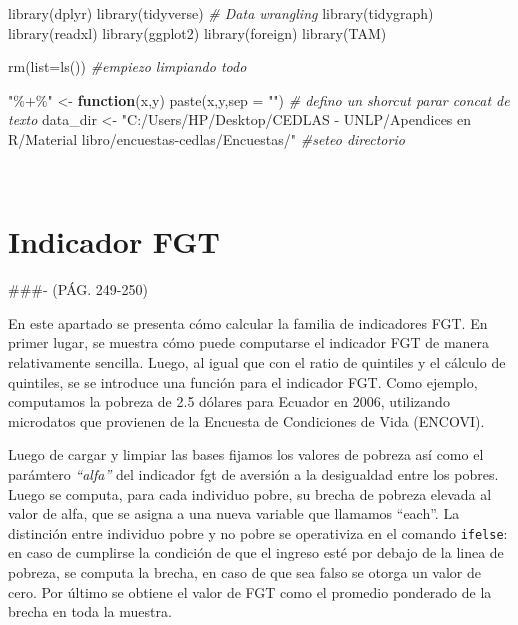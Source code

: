 \documentclass[
]{book}
\newenvironment{Shaded}{\begin{snugshade}}{\end{snugshade}}
\newcommand{\AttributeTok}[1]{\textcolor[rgb]{0.77,0.63,0.00}{#1}}
\newcommand{\CommentTok}[1]{\textcolor[rgb]{0.56,0.35,0.01}{\textit{#1}}}
\newcommand{\ControlFlowTok}[1]{\textcolor[rgb]{0.13,0.29,0.53}{\textbf{#1}}}
\newcommand{\FunctionTok}[1]{\textcolor[rgb]{0.00,0.00,0.00}{#1}}
\newcommand{\NormalTok}[1]{#1}
\newcommand{\OtherTok}[1]{\textcolor[rgb]{0.56,0.35,0.01}{#1}}
\newcommand{\StringTok}[1]{\textcolor[rgb]{0.31,0.60,0.02}{#1}}
\begin{document}
\begin{Shaded}
\begin{Highlighting}[]
\FunctionTok{library}\NormalTok{(dplyr)}
\FunctionTok{library}\NormalTok{(tidyverse) }\CommentTok{\# Data wrangling}
\FunctionTok{library}\NormalTok{(tidygraph)}
\FunctionTok{library}\NormalTok{(readxl)}
\FunctionTok{library}\NormalTok{(ggplot2)}
\FunctionTok{library}\NormalTok{(foreign)}
\FunctionTok{library}\NormalTok{(TAM)}

\FunctionTok{rm}\NormalTok{(}\AttributeTok{list=}\FunctionTok{ls}\NormalTok{())    }\CommentTok{\#empiezo limpiando todo }

\StringTok{"\%+\%"} \OtherTok{\textless{}{-}} \ControlFlowTok{function}\NormalTok{(x,y) }\FunctionTok{paste}\NormalTok{(x,y,}\AttributeTok{sep =} \StringTok{""}\NormalTok{)      }\CommentTok{\# defino un shorcut parar concat de texto}
\NormalTok{data\_dir }\OtherTok{\textless{}{-}} \StringTok{"C:/Users/HP/Desktop/CEDLAS {-} UNLP/Apendices en R/Material libro/encuestas{-}cedlas/Encuestas/"}  \CommentTok{\#seteo directorio }
\end{Highlighting}
\end{Shaded}

~

\hypertarget{indicador-fgt}{%
\section{Indicador FGT}\label{indicador-fgt}}

\#\#\#- (PÁG. 249-250)

En este apartado se presenta cómo calcular la familia de indicadores FGT. En primer lugar, se muestra cómo puede computarse el indicador FGT de manera relativamente sencilla. Luego, al igual que con el ratio de quintiles y el cálculo de quintiles, se se introduce una función para el indicador FGT. Como ejemplo, computamos la pobreza de 2.5 dólares para Ecuador en 2006, utilizando microdatos que provienen de la Encuesta de Condiciones de Vida (ENCOVI).

Luego de cargar y limpiar las bases fijamos los valores de pobreza así como el parámtero \emph{``alfa''} del indicador fgt de aversión a la desigualdad entre los pobres. Luego se computa, para cada individuo pobre, su brecha de pobreza elevada al valor de alfa, que se asigna a una nueva variable que llamamos ``each''. La distinción entre individuo pobre y no pobre se operativiza en el comando \texttt{ifelse}: en caso de cumplirse la condición de que el ingreso esté por debajo de la linea de pobreza, se computa la brecha, en caso de que sea falso se otorga un valor de cero. Por último se obtiene el valor de FGT como el promedio ponderado de la brecha en toda la muestra.
\end{document}
